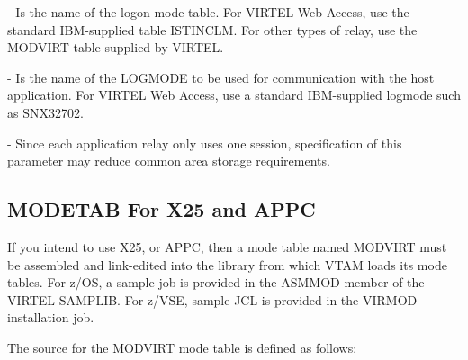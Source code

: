 \documentclass[letterpaper,10pt,english]{sphinxmanual}
\begin{document}
 - Is the name of the logon mode table. For VIRTEL Web Access, use the standard IBM-supplied table ISTINCLM. For other types of relay, use the MODVIRT table supplied by VIRTEL.

 - Is the name of the LOGMODE to be used for communication with the host application. For VIRTEL Web Access, use a standard IBM-supplied logmode such as SNX32702.

 - Since each application relay only uses one session, specification of this parameter may reduce common area storage requirements.


\subsection{MODETAB For X25 and APPC}
\label{\detokenize{Installation_Guide:modetab-for-x25-and-appc}}\label{\detokenize{Installation_Guide:index-24}}
If you intend to use X25, or APPC, then a mode table named MODVIRT must be assembled and link-edited into the library from which VTAM loads its mode tables. For z/OS, a sample job is provided     in the ASMMOD member of the VIRTEL SAMPLIB. For z/VSE, sample JCL is provided in the VIRMOD installation job.

The source for the MODVIRT mode table is defined as follows:
\end{document}
